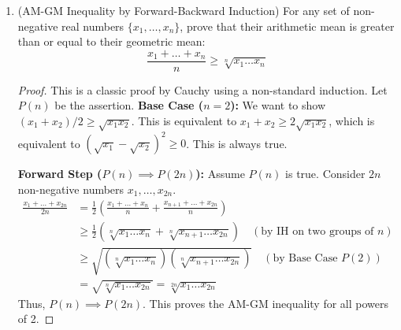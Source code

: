 \begin{enumerate}
\begin{proof}
    \textbf{Inductive Step:}
    Assume $P(k)$ is true for some $k \in \Nset{1}$. We must prove $P(k+1)$.
    Consider a $2^{k+1} \times 2^{k+1}$ board with one square removed. This board can be divided into four $2^k \times 2^k$ sub-boards.
    The removed square lies in exactly one of these four sub-boards. This sub-board is a $2^k \times 2^k$ grid with one square removed. By the inductive hypothesis, this sub-board can be tiled.
    Now consider the other three sub-boards, which are currently complete. Place a single L-tromino at the center of the main board, oriented such that it covers exactly one corner square from each of these three complete sub-boards.
    Now, each of these three sub-boards has become a $2^k \times 2^k$ grid with one square removed (the one covered by our central tromino). By the inductive hypothesis, each of these three can also be tiled.
    We have successfully tiled the entire $2^{k+1} \times 2^{k+1}$ board. Thus $P(k) \implies P(k+1)$.
    By the Principle of Standard Induction, the property holds for all $n \in \Nset{1}$.
    \end{proof}

    \item {} (AM-GM Inequality by Forward-Backward Induction) For any set of non-negative real numbers $\{x_1, \dots, x_n\}$, prove that their arithmetic mean is greater than or equal to their geometric mean:
    $$ \frac{x_1 + \dots + x_n}{n} \ge \sqrt[n]{x_1 \dots x_n} $$
    \begin{proof}
    This is a classic proof by Cauchy using a non-standard induction. Let $P(n)$ be the assertion.
    \textbf{Base Case ($n=2$):} We want to show $(x_1+x_2)/2 \ge \sqrt{x_1x_2}$. This is equivalent to $x_1+x_2 \ge 2\sqrt{x_1x_2}$, which is equivalent to $(\sqrt{x_1}-\sqrt{x_2})^2 \ge 0$. This is always true.
    
    \textbf{Forward Step ($P(n) \implies P(2n)$):}
    Assume $P(n)$ is true. Consider $2n$ non-negative numbers $x_1, \dots, x_{2n}$.
    \begin{align*}
        \frac{x_1 + \dots + x_{2n}}{2n} &= \frac{1}{2} \left( \frac{x_1+\dots+x_n}{n} + \frac{x_{n+1}+\dots+x_{2n}}{n} \right) \\
        &\ge \frac{1}{2} (\sqrt[n]{x_1\dots x_n} + \sqrt[n]{x_{n+1}\dots x_{2n}}) \quad (\text{by IH on two groups of } n) \\
        &\ge \sqrt{(\sqrt[n]{x_1\dots x_n})(\sqrt[n]{x_{n+1}\dots x_{2n}})} \quad (\text{by Base Case } P(2)) \\
        &= \sqrt{\sqrt[n]{x_1\dots x_{2n}}} = \sqrt[2n]{x_1\dots x_{2n}}
    \end{align*}
    Thus, $P(n) \implies P(2n)$. This proves the AM-GM inequality for all powers of 2.
    

\end{proof}
\end{enumerate}
